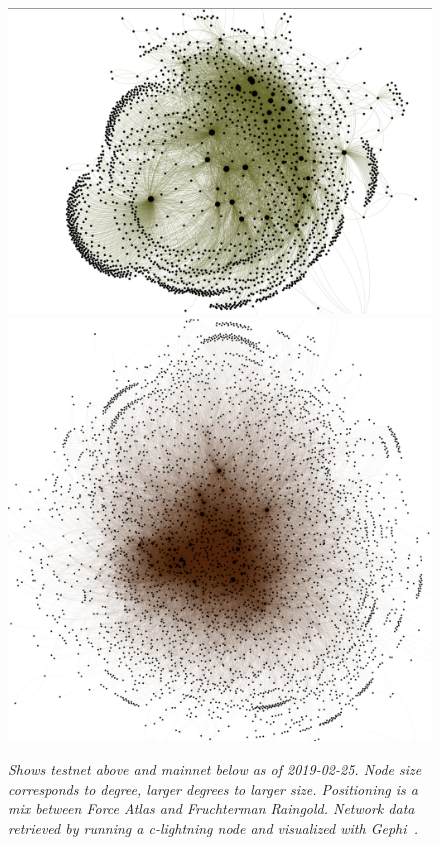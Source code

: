 \begin{figure}[!htb]
	\hspace*{-0.7cm} 
	\centering
	\includegraphics[width=12cm]{graphs/testnet_force.png}
	\vspace*{-0.4cm} 
	\includegraphics[width=13.6cm]{graphs/mainnet_force3.png}
	\caption{\textit{
			Shows testnet above and mainnet below as of 2019-02-25. Node size corresponds to degree, larger degrees to larger size. Positioning is a mix between Force Atlas and Fruchterman Raingold. Network data retrieved by running a c-lightning node and visualized with Gephi~\cite{repository:gephi}.}}
	\label{fig:topology}
	\hspace*{2mm} 	
\end{figure}
\newpage
\twocolumn

